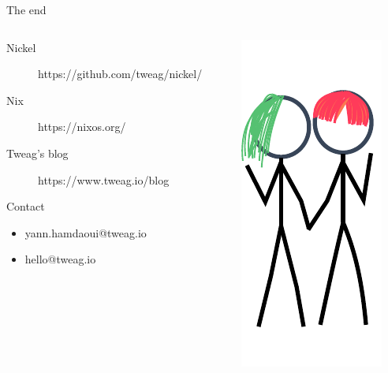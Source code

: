 \documentclass[aspectratio=169]{beamer}
\begin{document}
\begin{frame}{The end}
    \begin{columns}
    \begin{column}{0.69\textwidth}
    \begin{description}
        \item[Nickel] https://github.com/tweag/nickel/
        \item[Nix] https://nixos.org/
        \item[Tweag's blog] https://www.tweag.io/blog
    \end{description}

    \begin{block}{Contact}
        \begin{itemize}
        \item yann.hamdaoui@tweag.io
        \item hello@tweag.io
        \end{itemize}
    \end{block}
    \end{column}
    \begin{column}{0.30\textwidth}
        \includegraphics[height=0.7\textheight]{img/princess-comics-bye.pdf}
    \end{column}
\end{columns}
\end{frame}
\end{document}

